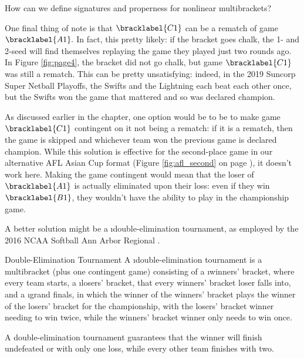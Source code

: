 {    \begin{oq}{}{}
        How can we define signatures and properness for nonlinear multibrackets?
    \end{oq}

    One final thing of note is that $\bracklabel{C1}$ can be a rematch of game $\bracklabel{A1}.$ In fact, this pretty likely: if the bracket goes chalk, the 1- and 2-seed will find themselves replaying the game they played just two rounds ago. In Figure \ref{fig:page4}, the bracket did not go chalk, but game $\bracklabel{C1}$ was still a rematch. 
    This can be pretty unsatisfying: indeed, in the 2019 Suncorp Super Netball Playoffs, the Swifts and the Lightning each beat each other once, but the Swifts won the game that mattered and so was declared champion. 
    
    As discussed earlier in the chapter, one option would be to be to make game $\bracklabel{C1}$ contingent on it not being a rematch: if it is a rematch, then the game is skipped and whichever team won the previous game is declared champion. While this solution is effective for the second-place game in our alternative AFL Asian Cup format (Figure \ref{fig:afl_second} on page \pageref{fig:afl_second}), it doesn't work here. Making the game contingent would mean that the loser of $\bracklabel{A1}$ is actually eliminated upon their loss: even if they win $\bracklabel{B1}$, they wouldn't have the ability to play in the championship game.

    A better solution might be a \i{double-elimination tournament}, as employed by the 2016 NCAA Softball Ann Arbor Regional \cite{wiki_soft}.


    \begin{definition}{Double-Elimination Tournament}{}
        A \i{double-elimination} tournament is a multibracket (plus one contingent game) consisting of a \i{winners' bracket}, where every team starts, a \i{losers'} bracket, that every winners' bracket loser falls into, and a \i{grand finals}, in which the winner of the winners' bracket plays the winner of the losers' bracket for the championship, with the losers' bracket winner needing to win twice, while the winners' bracket winner only needs to win once. 
    \end{definition}

    A double-elimination tournament guarantees that the winner will finish undefeated or with only one loss, while every other team finishes with two.

}
